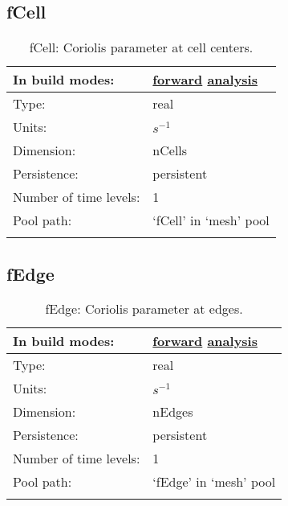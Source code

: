 \subsection[fCell]{fCell}
\label{subsec:var_sec_mesh_fCell}
\begin{center}
\begin{longtable}{| p{2.0in} | p{4.0in} |}
        \hline 
        In build modes: & \hyperref[subsec:forward_var_tab_mesh]{forward} \hyperref[subsec:analysis_var_tab_mesh]{analysis} \\
        \hline 
        Type: & real \\
        \hline 
        Units: & $s^{-1}$ \\
        \hline 
        Dimension: & nCells \\
        \hline 
        Persistence: & persistent \\
        \hline 
        Number of time levels: & 1 \\
        \hline 
            Pool path: & `fCell' in `mesh' pool \\
		 \hline 
    \caption{fCell: Coriolis parameter at cell centers.}
\end{longtable}
\end{center}
\subsection[fEdge]{fEdge}
\label{subsec:var_sec_mesh_fEdge}
\begin{center}
\begin{longtable}{| p{2.0in} | p{4.0in} |}
        \hline 
        In build modes: & \hyperref[subsec:forward_var_tab_mesh]{forward} \hyperref[subsec:analysis_var_tab_mesh]{analysis} \\
        \hline 
        Type: & real \\
        \hline 
        Units: & $s^{-1}$ \\
        \hline 
        Dimension: & nEdges \\
        \hline 
        Persistence: & persistent \\
        \hline 
        Number of time levels: & 1 \\
        \hline 
            Pool path: & `fEdge' in `mesh' pool \\
		 \hline 
    \caption{fEdge: Coriolis parameter at edges.}
\end{longtable}
\end{center}
